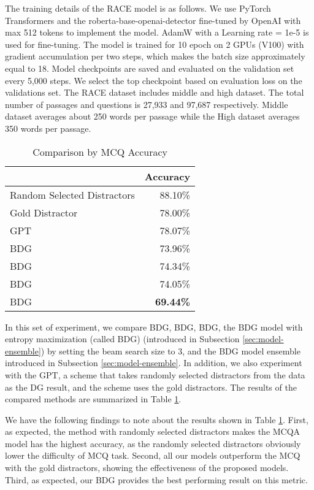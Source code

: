 \documentclass[11pt,a4paper]{article}
\begin{document}
The training details of the RACE model is as follows. We use PyTorch  Transformers\cite{Wolf2019HuggingFacesTS} and the roberta-base-openai-detector fine-tuned by OpenAI \cite{solaiman2019release} with max 512 tokens to implement the model. AdamW with a Learning rate = 1e-5 is used for fine-tuning. The model is trained for 10 epoch on 2 GPUs (V100) with gradient accumulation per two steps, which makes the batch size approximately equal to 18. Model checkpoints are saved and evaluated on the validation set every 5,000 steps. We select the top checkpoint based on evaluation loss on the validations set. The RACE dataset includes middle and high dataset. The total number of passages and questions is 27,933 and 97,687 respectively. Middle dataset averages about 250 words per passage while the High dataset averages 350 words per passage.

\begin{table}
    \centering
    \begin{tabular}{|l|r|}
        \hline
         & \multicolumn{1}{l|}{Accuracy} \\ \hline
        Random Selected Distractors & 88.10\% \\ \hline
        Gold Distractor & 78.00\% \\ \hline
        GPT & 78.07\% \\ \hline
        BDG & 73.96\% \\ \hline
        BDG & 74.34\% \\ \hline
        BDG & 74.05\% \\ \hline
        BDG  & \textbf{69.44\%} \\ \hline
    \end{tabular}
\caption{Comparison by MCQ Accuracy}
\label{tab:rc result}
\end{table}

In this set of experiment, we compare BDG, BDG, BDG, the BDG model with entropy maximization (called BDG) (introduced in Subsection \ref{sec:model-ensemble}) by setting the beam search size to 3, and the BDG model ensemble introduced in Subsection \ref{sec:model-ensemble}. In addition, we also experiment with the GPT, a scheme that takes randomly selected distractors from the data as the DG result, and the scheme uses the gold distractors. The results of the compared methods are summarized in Table \ref{tab:rc result}. 

We have the following findings to note about the results shown in Table \ref{tab:rc result}. First, as expected, the method with randomly selected distractors makes the MCQA model has the highest accuracy, as the randomly selected distractors obviously lower the difficulty of MCQ task. Second, all our models outperform the MCQ with the gold distractors, showing the effectiveness of the proposed models. Third, as expected, our BDG provides the best performing result on this metric.
\end{document}
